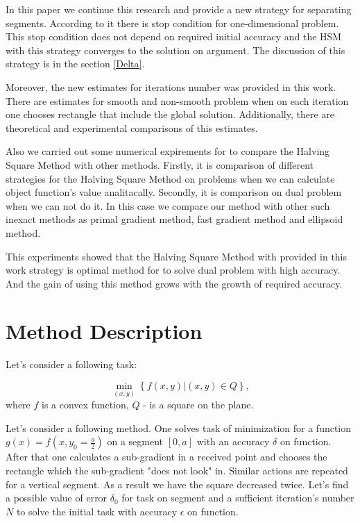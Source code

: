 \documentclass[12pt]{article}
\begin{document}
In this paper we continue this research and provide a new strategy for separating segments. According to it there is stop condition for one-dimensional problem. This stop condition does not depend on required initial accuracy and the HSM with this strategy converges to the solution on argument. The discussion of this strategy is in the section \ref{Delta}.

Moreover, the new estimates for iterations number was provided in this work. There are estimates for smooth and non-smooth problem when on each iteration one chooses rectangle that include the global solution. Additionally, there are theoretical and experimental comparisons of this estimates.

Also we carried out some numerical expirements for to compare the Halving Square Method with other methods. Firstly, it is comparison of different strategies for the Halving Square Method on problems when we can calculate object function's value analitacally. Secondly, it is comparison on dual problem when we can not do it. In this case we compare our method with other such inexact methods as primal gradient method, fast gradient method and ellipsoid method.

This experiments showed that the Halving Square Method with provided in this work strategy is optimal method for to solve dual problem with high accuracy. And the gain of using this method grows with the growth of required accuracy.

\section{Method Description}

Let's consider a following task:

$$\min_{(x,y)}\left\{f(x,y)|(x,y) \in Q\right\},$$
where $f$ is a convex function, $Q$ - is a square on the plane.

Let's consider a following method. One solves task of minimization for a function $g(x) = f\left(x, y_0 = \frac{a}{2}\right)$ on a segment $[0, a]$ with an accuracy $\delta$ on function. After that one calculates a sub-gradient in a received point and chooses the rectangle which the sub-gradient "does not look" in. Similar actions are repeated for a vertical segment. As a result we have the square decreased twice. Let's find a possible value of error $\delta_0$ for task on segment and a sufficient iteration's number $N$ to solve the initial task with accuracy $\epsilon$ on function.
\end{document}
